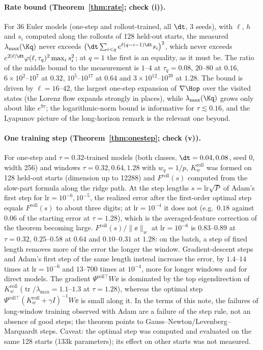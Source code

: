 \paragraph{Rate bound (Theorem~\ref{thm:rate}; check (i)).}
For 36 Euler models (one-step and rollout-trained, all $\dt$, 3 seeds), with $\ell$, $h$ and $s_i$ computed along the rollouts of 128 held-out starts, the measured $\lambda_{\max}(\Kq)$ never exceeds $\big(\dt\sum_{i<q}e^{\ell(q-i-1)\dt}s_i\big)^2$, which never exceeds $e^{2|\ell|\dt}\varphi(\ell,\tau_q)^2\max_i s_i^2$; at $q = 1$ the first is an equality, as it must be.
The ratio of the middle bound to the measurement is $1$--$4$ at $\tau_q = 0.08$, $20$--$80$ at $0.16$, $6\times10^2$--$10^7$ at $0.32$, $10^5$--$10^{17}$ at $0.64$ and $3\times10^{12}$--$10^{39}$ at $1.28$.
The bound is driven by $\ell = 16$--$42$, the largest one-step expansion of $\nabla\Hop$ over the visited states (the Lorenz flow expands strongly in places), while $\lambda_{\max}(\Kq)$ grows only about like $e^{9\tau}$; the logarithmic-norm bound is informative for $\tau\lesssim0.16$, and the Lyapunov picture of the long-horizon remark is the relevant one beyond.

\paragraph{One training step (Theorem~\ref{thm:onestep}; check (v)).}
For one-step and $\tau=0.32$-trained models (both classes, $\dt = 0.04, 0.08$, seed 0, width 256) and windows $\tau = 0.32, 0.64, 1.28$ with $w_q = 1/p$, $K^{\mathrm{roll}}_w$ was formed on 128 held-out starts (dimension up to 12288) and $F^{\mathrm{roll}}(s)$ computed from the slow-part formula along the ridge path.
At the step lengths $s = \mathrm{lr}\sqrt{P}$ of Adam's first step for $\mathrm{lr} = 10^{-6}, 10^{-5}$, the realized error after the first-order optimal step equals $F^{\mathrm{roll}}(s)$ to about three digits; at $\mathrm{lr} = 10^{-4}$ it does not (e.g.\ $0.18$ against $0.06$ of the starting error at $\tau = 1.28$), which is the averaged-feature correction of the theorem becoming large.
$F^{\mathrm{roll}}(s)/\|\ee\|_w$ at $\mathrm{lr} = 10^{-6}$ is $0.83$--$0.89$ at $\tau = 0.32$, $0.25$--$0.58$ at $0.64$ and $0.10$--$0.31$ at $1.28$: on the batch, a step of fixed length removes more of the error the longer the window.
Gradient-descent steps and Adam's first step of the same length instead increase the error, by $1.4$--$14$ times at $\mathrm{lr} = 10^{-6}$ and $13$--$700$ times at $10^{-4}$, more for longer windows and for direct models.
The gradient $\Psi^{\mathrm{roll}\top}W\ee$ is dominated by the top eigendirection of $K^{\mathrm{roll}}_w$ ($\operatorname{tr}/\lambda_{\max} = 1.1$--$1.3$ at $\tau = 1.28$), whereas the optimal step $\Psi^{\mathrm{roll}\top}(K^{\mathrm{roll}}_w + \gamma I)^{-1}W\ee$ is small along it.
In the terms of this note, the failures of long-window training observed with Adam are a failure of the step rule, not an absence of good steps; the theorem points to Gauss--Newton/Levenberg--Marquardt steps.
Caveat: the optimal step was computed and evaluated on the same 128 starts (133k parameters); its effect on other starts was not measured.

